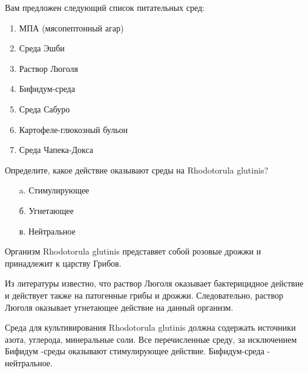
Вам предложен следующий список питательных сред:

\begin{enumerate}
    \item МПА (мясопептонный агар)
    \item Среда Эшби
    \item Раствор Люголя
    \item Бифидум-среда
    \item Среда Сабуро
    \item Картофеле-глюкозный бульон
    \item Среда Чапека-Докса
\end{enumerate}

Определите, какое действие оказывают среды на  Rhodotorula glutinis?

\begin{enumerate}
    \item[a.] Стимулирующее
    \item[б.] Угнетающее
    \item[в.] Нейтральное
\end{enumerate}

\explanationSection

Организм Rhodotorula glutinis представяет собой розовые дрожжи и принадлежит к царству Грибов. 

Из литературы известно, что раствор Люголя оказывает бактерицидное действие и действует также на патогенные грибы и дрожжи. Следовательно, раствор Люголя оказывает угнетающее действие на данный организм. 

Среда для культивирования Rhodotorula glutinis должна содержать источники азота, углерода, минеральные соли. Все перечисленные среду, за исключением Бифидум -среды оказывают стимулирующее действие. Бифидум-среда - нейтральное.

